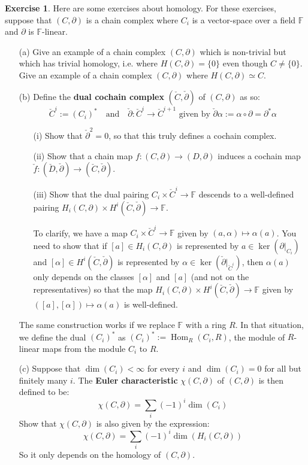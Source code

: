 \documentclass[12pt]{article}
\theoremstyle{definition}
\newtheorem{exercise}[theorem]{Exercise}
\numberwithin{equation}{section}
\newcommand{\op}{\operatorname}
\begin{document}
\begin{exercise} \label{ex:homology} Here are some exercises about homology. For these exercises, suppose that $(C,\partial)$ is a chain complex where $C_i$ is a vector-space over a field $\mathbb{F}$ and $\partial$ is $\mathbb{F}$-linear. 
\begin{itemize}
	\item[(a)] Give an example of a chain complex $(C,\partial)$ which is non-trivial but which has trivial homology, i.e. where $H(C,\partial) = \{0\}$ even though $C \neq \{0\}$. Give an example of a chain complex $(C,\partial)$ where $H(C,\partial) \simeq C$.
	\item[(b)] Define the {\bf dual cochain complex} $(\check{C}, \check{\partial})$ of $(C,\partial)$ as so:
	\[
	\check{C}^i := (C_i)^* \quad\text{and}\quad \check{\partial}:\check{C}^i \to \check{C}^{i+1} \text{ given by }\check{\partial}\alpha := \alpha \circ \partial = \partial^*\alpha
	\]
	\begin{enumerate}
		\item[(i)] Show that $\check{\partial}^2 = 0$, so that this truly defines a cochain complex.
		\item[(ii)] Show that a chain map $f:(C,\partial) \to (D,\partial)$ induces a cochain map $\check{f}:(\check{D},\check{\partial}) \to (\check{C},\check{\partial})$.
		\item[(iii)] Show that the dual pairing $C_i \times \check{C}^i \to \mathbb{F}$ descends to a well-defined pairing $H_i(C,\partial) \times H^i(\check{C},\check{\partial}) \to \mathbb{F}$. 

		To clarify, we have a map $C_i \times \check{C}^i \to \mathbb{F}$ given by $(a,\alpha) \mapsto \alpha(a)$. You need to show that if $[a] \in H_i(C,\partial)$ is represented by $a \in \op{ker}(\partial|_{C_i})$ and $[\alpha] \in H^i(\check{C},\check{\partial})$ is represented by $\alpha \in \op{ker}(\check{\partial}|_{\check{C}^i})$, then $\alpha(a)$ only depends on the classes $[\alpha]$ and $[a]$ (and not on the representatives) so that the map $H_i(C,\partial) \times H^i(\check{C},\check{\partial}) \to \mathbb{F}$ given by $([a],[\alpha]) \mapsto \alpha(a)$ is well-defined.
	\end{enumerate} 

	The same construction works if we replace $\mathbb{F}$ with a ring $R$. In that situation, we define the dual $(C_i)^*$ as $(C_i)^* := \op{Hom}_R(C_i,R)$, the module of $R$-linear maps from the module $C_i$ to $R$.
	\item[(c)] Suppose that $\op{dim}(C_i) < \infty$ for every $i$ and $\op{dim}(C_i) = 0$ for all but finitely many $i$. The {\bf Euler characteristic} $\chi(C,\partial)$ of $(C,\partial)$ is then defined to be:
	\[
	\chi(C,\partial) = \sum_i (-1)^i \op{dim}(C_i)
	\]
	Show that $\chi(C,\partial)$ is also given by the expression:
	\[
	\chi(C,\partial) = \sum_i (-1)^i \op{dim}(H_i(C,\partial))
	\]
	So it only depends on the homology of $(C,\partial)$.
\end{itemize}
\end{exercise}
\end{document}
